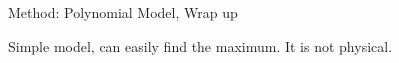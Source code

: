 \documentclass[10pt]{beamer}
\begin{document}
\begin{frame}{Method: Polynomial Model, Wrap up}
	\begin{outline}
		\1Simple model, can easily find the maximum.
		\1It is not physical.
	\end{outline}
\end{frame}



\end{document}
